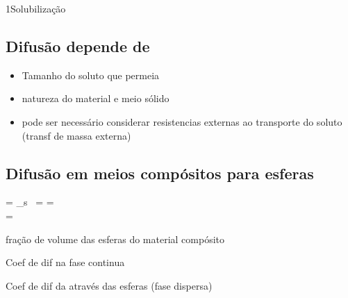 \documentclass[\mainfilename]{subfiles}
\begin{document}
\begin{sectionBox}1{Solubilização} %
    
    \subsection*{Difusão depende de}
    \begin{itemize}
        \item Tamanho do soluto que permeia
        \item natureza do material e meio sólido
        \item pode ser necessário considerar resistencias externas ao transporte do soluto (transf de massa externa)
    \end{itemize}
    
    \subsection*{Difusão em meios compósitos para esferas}
    \begin{BM}
        = \phi_s
        \,
        \iff
        = 
        =\\
        = 
    \end{BM}
    \begin{description}[
        leftmargin=!,
        labelwidth=\widthof{} %
    ]
        \item[\(\phi_S\)] fração de volume das esferas do material compósito
        \item[\(\mathscr{D}\)] Coef de dif na fase continua
        \item[\(\mathscr{D}_S\)] Coef de dif da através das esferas (fase dispersa)
    \end{description}


\end{sectionBox}
\end{document}
